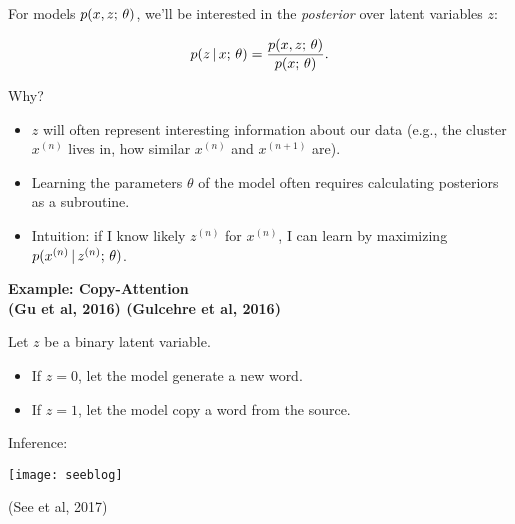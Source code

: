 \begin{frame}
    For models $p(x, z ; \, \theta)$, we'll be interested in the \textit{posterior} over latent variables $z$:
    
    \begin{align*}
        p(z \,|\, x ; \, \theta) = \frac{\displaystyle p(x, z ; \, \theta)}{\displaystyle p(x ; \, \theta)}.
    \end{align*}
    
    \air
    
    \air
    \pause
    Why?
    \begin{itemize}
        \item $z$ will often represent interesting information about our data (e.g., the cluster $x^{(n)}$ lives in, how similar $x^{(n)}$ and $x^{(n+1)}$ are).
        
        \item Learning the parameters $\theta$ of the model often requires calculating posteriors as a subroutine. \item Intuition: if I know likely $z^{(n)}$ for $x^{(n)}$, I can learn by maximizing $p(x^{(n)} \,|\, z^{(n)} ; \, \theta)$.
    \end{itemize}
    
\end{frame}

\begin{frame}
  \begin{center}
    \textbf{ Example: Copy-Attention \\
      \small{(Gu et al, 2016) (Gulcehre et al, 2016)}}
  \end{center}

Let $z$ be a binary latent variable. 
\air
\begin{itemize}
\item If $z = 0$, let the model generate a new word. 
\item If $z = 1$, let the model copy a word from the source.   
\end{itemize}

Inference:

\begin{center}
  

\texttt{[image: seeblog]}

\centerline{\small (See et al, 2017)}
\end{center}
\end{frame}


